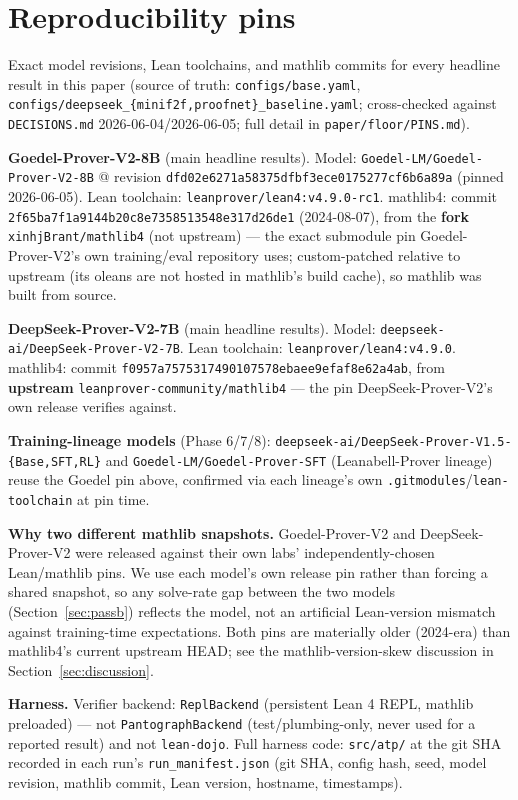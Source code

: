 \documentclass{article}
\begin{document}



\appendix
\section{Reproducibility pins}
\label{app:pins}

Exact model revisions, Lean toolchains, and mathlib commits for every headline result in this paper
(source of truth: \texttt{configs/base.yaml}, \texttt{configs/deepseek\_\{minif2f,proofnet\}\_baseline.yaml};
cross-checked against \texttt{DECISIONS.md} 2026-06-04/2026-06-05; full detail in
\texttt{paper/floor/PINS.md}).

\textbf{Goedel-Prover-V2-8B} (main headline results). Model: \texttt{Goedel-LM/Goedel-Prover-V2-8B} @
revision \texttt{dfd02e6271a58375dfbf3ece0175277cf6b6a89a} (pinned 2026-06-05). Lean toolchain:
\texttt{leanprover/lean4:v4.9.0-rc1}. mathlib4: commit \texttt{2f65ba7f1a9144b20c8e7358513548e317d26de1}
(2024-08-07), from the \textbf{fork} \texttt{xinhjBrant/mathlib4} (not upstream) --- the exact submodule
pin Goedel-Prover-V2's own training/eval repository uses; custom-patched relative to upstream (its
oleans are not hosted in mathlib's build cache), so mathlib was built from source.

\textbf{DeepSeek-Prover-V2-7B} (main headline results). Model: \texttt{deepseek-ai/DeepSeek-Prover-V2-7B}.
Lean toolchain: \texttt{leanprover/lean4:v4.9.0}. mathlib4: commit
\texttt{f0957a7575317490107578ebaee9efaf8e62a4ab}, from \textbf{upstream}
\texttt{leanprover-community/mathlib4} --- the pin DeepSeek-Prover-V2's own release verifies against.

\textbf{Training-lineage models} (Phase 6/7/8): \texttt{deepseek-ai/DeepSeek-Prover-V1.5-\{Base,SFT,RL\}}
and \texttt{Goedel-LM/Goedel-Prover-SFT} (Leanabell-Prover lineage) reuse the Goedel pin above, confirmed
via each lineage's own \texttt{.gitmodules}/\texttt{lean-toolchain} at pin time.

\textbf{Why two different mathlib snapshots.} Goedel-Prover-V2 and DeepSeek-Prover-V2 were released
against their own labs' independently-chosen Lean/mathlib pins. We use each model's own release pin
rather than forcing a shared snapshot, so any solve-rate gap between the two models
(Section~\ref{sec:passb}) reflects the model, not an artificial Lean-version mismatch against
training-time expectations. Both pins are materially older (2024-era) than mathlib4's current upstream
HEAD; see the mathlib-version-skew discussion in Section~\ref{sec:discussion}.

\textbf{Harness.} Verifier backend: \texttt{ReplBackend} (persistent Lean 4 REPL, mathlib preloaded) ---
not \texttt{PantographBackend} (test/plumbing-only, never used for a reported result) and not
\texttt{lean-dojo}. Full harness code: \texttt{src/atp/} at the git SHA recorded in each run's
\texttt{run\_manifest.json} (git SHA, config hash, seed, model revision, mathlib commit, Lean version,
hostname, timestamps).
\end{document}

